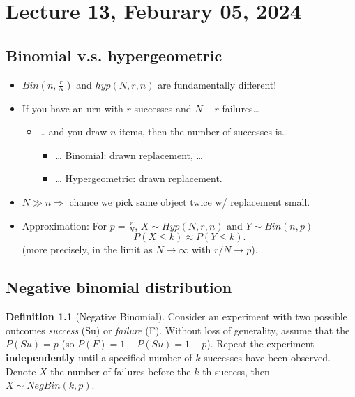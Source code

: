 \documentclass[
]{book}
\providecommand{\tightlist}{%
  \setlength{\itemsep}{0pt}\setlength{\parskip}{0pt}}
\theoremstyle{definition}
\newtheorem{definition}{Definition}[chapter]
\theoremstyle{definition}
\theoremstyle{definition}
\theoremstyle{definition}
\theoremstyle{remark}
\begin{document}
\chapter{Lecture 13, Feburary 05, 2024}\label{lecture-13-feburary-05-2024}

\section{Binomial v.s. hypergeometric}\label{binomial-v.s.-hypergeometric}

\begin{itemize}
\tightlist
\item
  \(Bin(n,\frac{r}{N})\) and \(hyp(N,r,n)\) are fundamentally different!
\item
  If you have an urn with \(r\) successes and \(N-r\) failures\ldots{}

  \begin{itemize}
  \tightlist
  \item
    \ldots{} and you draw \(n\) items, then the number of successes is\ldots{}

    \begin{itemize}
    \tightlist
    \item
      \ldots{} Binomial: drawn  replacement, \ldots{}
    \item
      \ldots{} Hypergeometric: drawn  replacement.
    \end{itemize}
  \end{itemize}
\item
  \(N\gg n \Rightarrow\) chance we pick same object twice w/ replacement small.
\item
  \alert{Approximation:} For \(p=\frac{r}{N}\), \(X\sim Hyp(N,r,n)\) and \(Y\sim Bin(n,p)\)
  \[ P(X \leq k) \approx P(Y\leq k).\]
  (more precisely, in the limit as \(N\rightarrow\infty\) with \(r/N\rightarrow p\)).
\end{itemize}

\section{Negative binomial distribution}\label{negative-binomial-distribution}

\begin{definition}[Negative Binomial]
Consider an experiment with two possible outcomes \emph{success} (Su) or \emph{failure} (F). Without loss of generality, assume that the \(P(Su)=p\) (so \(P(F)=1-P(Su)= 1-p\)). Repeat the experiment \textbf{independently} until a specified number of \(k\) successes have been observed. Denote \(X\) the number of failures before the \(k\)-th suceess, then \(X\sim NegBin(k,p)\).
\end{definition}
\end{document}
